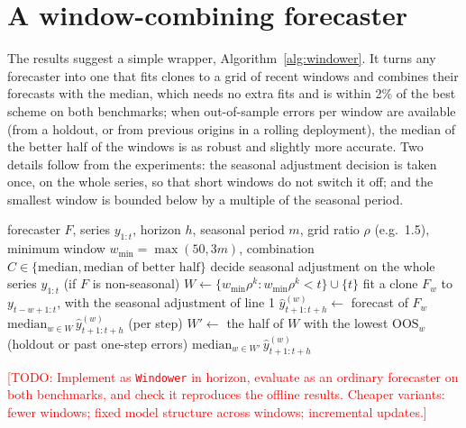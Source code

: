 \documentclass[11pt]{article}
\newcommand{\todo}[1]{\textcolor{red}{[TODO: #1]}}
\begin{document}
\section{A window-combining forecaster}
\label{sec:algorithm}

The results suggest a simple wrapper, Algorithm~\ref{alg:windower}. It turns any
forecaster into one that fits clones to a grid of recent windows and combines
their forecasts with the median, which needs no extra fits and is within 2\%
of the best scheme on both benchmarks; when out-of-sample errors per window are
available (from a holdout, or from previous origins in a rolling deployment),
the median of the better half of the windows is as robust and slightly more
accurate. Two details follow from
the experiments: the seasonal adjustment decision is taken once, on the whole
series, so that short windows do not switch it off; and the smallest window is
bounded below by a multiple of the seasonal period.

\begin{algorithm}[t]
\caption{\textsc{Windower}: fit and forecast with a combination of training windows}
\label{alg:windower}
\begin{algorithmic}[1]
\REQUIRE forecaster $F$, series $y_{1:t}$, horizon $h$, seasonal period $m$,
grid ratio $\rho$ (e.g.\ 1.5), minimum window $w_{\min}=\max(50, 3m)$,
combination $C\in\{\text{median}, \text{median of better half}\}$
\STATE decide seasonal adjustment on the whole series $y_{1:t}$ (if $F$ is non-seasonal)
\STATE $W \gets \{w_{\min}\rho^k : w_{\min}\rho^k < t\} \cup \{t\}$ 
  \STATE fit a clone $F_w$ to $y_{t-w+1:t}$, with the seasonal adjustment of line 1
  \STATE $\hat y^{(w)}_{t+1:t+h} \gets$ forecast of $F_w$
\ENDFOR
{}
  \RETURN $\mathrm{median}_{w\in W}\, \hat y^{(w)}_{t+1:t+h}$ (per step)
\ELSE
  \STATE $W' \gets$ the half of $W$ with the lowest $\mathrm{OOS}_w$ (holdout or past one-step errors)
  \RETURN $\mathrm{median}_{w\in W'}\, \hat y^{(w)}_{t+1:t+h}$
\ENDIF
\end{algorithmic}
\end{algorithm}

\todo{Implement as \texttt{Windower} in horizon, evaluate as an ordinary
forecaster on both benchmarks, and check it reproduces the offline results.
Cheaper variants: fewer windows; fixed model structure across windows;
incremental updates.}

\end{document}
